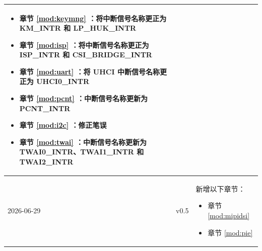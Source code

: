 \begin{longtable}[l]{ | m{2cm} | m{1.5cm} | m{12cm} | }
\begin{itemize}
        \item 章节 \ref{mod:keymng} \textit{\nameref{mod:keymng}}：将中断信号名称更正为 KM\_INTR 和 LP\_HUK\_INTR %
        \item 章节 \ref{mod:isp} \textit{\nameref{mod:isp}}：将中断信号名称更正为 ISP\_INTR 和 CSI\_BRIDGE\_INTR %
        \item 章节 \ref{mod:uart} \textit{\nameref{mod:uart}}：将 UHCI 中断信号名称更正为 UHCI0\_INTR %
        \item 章节 \ref{mod:pcnt} \textit{\nameref{mod:pcnt}}：中断信号名称更新为 PCNT\_INTR
        \item 章节 \ref{mod:i2c} \textit{\nameref{mod:i2c}}：修正笔误 %
        \item 章节 \ref{mod:twai} \textit{\nameref{mod:twai}}：中断信号名称更新为 TWAI0\_INTR、TWAI1\_INTR 和 TWAI2\_INTR %
    \end{itemize}
    \\\hline
    2026-06-29 & v0.5 &
    新增以下章节：
    \begin{itemize}
        \item 章节 \ref{mod:mipidsi} \textit{\nameref{mod:mipidsi}}
        \item 章节 \ref{mod:pie} \textit{\nameref{mod:pie}}
    \end{itemize}


\end{longtable}
